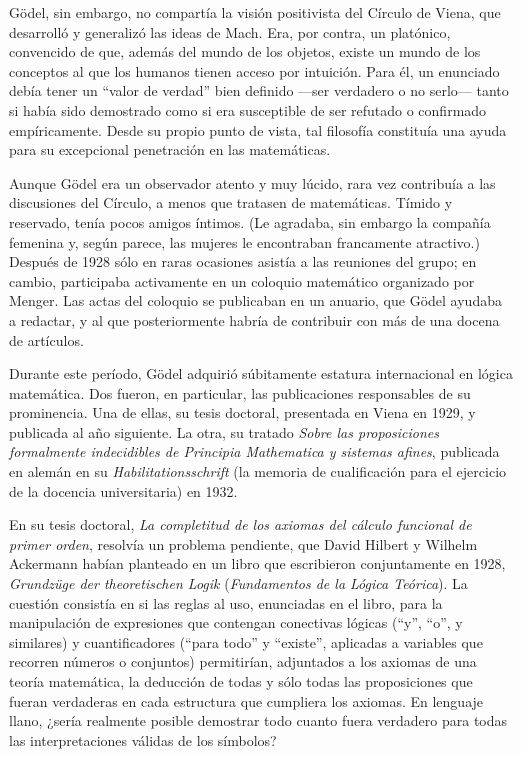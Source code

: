 \documentclass[a4paper, 12pt]{article}
\begin{document}
Gödel, sin embargo, no compartía la visión positivista del Círculo de Viena, que desarrolló y generalizó las ideas de Mach. Era, por contra, un platónico, convencido de que, además del mundo de los objetos, existe un mundo de los conceptos al que los humanos tienen acceso por intuición. Para él, un enunciado debía tener un ``valor de verdad'' bien definido ---ser verdadero o no serlo--- tanto si había sido demostrado como si era susceptible de ser refutado o confirmado empíricamente. Desde su propio punto de vista, tal filosofía constituía una ayuda para su excepcional penetración en las matemáticas.

Aunque Gödel era un observador atento y muy lúcido, rara vez contribuía a las discusiones del Círculo, a menos que tratasen de matemáticas. Tímido y reservado, tenía pocos amigos íntimos. (Le agradaba, sin embargo la compañía femenina y, según parece, las mujeres le encontraban francamente atractivo.) Después de 1928 sólo en raras ocasiones asistía a las reuniones del grupo; en cambio, participaba activamente en un coloquio matemático organizado por Menger. Las actas del coloquio se publicaban en un anuario, que Gödel ayudaba a redactar, y al que posteriormente habría de contribuir con más de una docena de artículos.

Durante este período, Gödel adquirió súbitamente estatura internacional en lógica matemática. Dos fueron, en particular, las publicaciones responsables de su prominencia. Una de ellas, su tesis doctoral, presentada en Viena en 1929, y publicada al año siguiente. La otra, su tratado {\it Sobre las proposiciones formalmente indecidibles de Principia Mathematica y sistemas afines}, publicada en alemán en su {\it Habilitationsschrift} (la memoria de cualificación para el ejercicio de la docencia universitaria) en 1932.

En su tesis doctoral, {\it La completitud de los axiomas del cálculo funcional de primer orden}, resolvía un problema pendiente, que David Hilbert y Wilhelm Ackermann habían planteado en un libro que escribieron conjuntamente en 1928, {\it Grundzüge der theoretischen Logik} ({\it Fundamentos de la Lógica Teórica}). La cuestión consistía en si las reglas al uso, enunciadas en el libro, para la manipulación de expresiones que contengan conectivas lógicas (``y'', ``o'', y similares) y cuantificadores (``para todo'' y ``existe'', aplicadas a variables que recorren números o conjuntos) permitirían, adjuntados a los axiomas de una teoría matemática, la deducción de todas y sólo todas las proposiciones que fueran verdaderas en cada estructura que cumpliera los axiomas. En lenguaje llano, ¿sería realmente posible demostrar todo cuanto fuera verdadero para todas las interpretaciones válidas de los símbolos?
\end{document}
